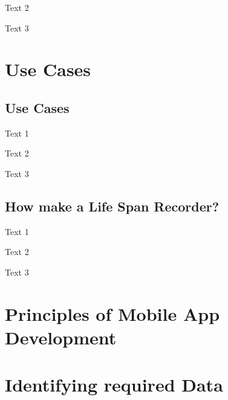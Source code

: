 Text 2

Text 3

\section{Use Cases} \label{sec:m3}

\subsection{Use Cases} \label{sec:m3.1}
Text 1

Text 2

Text 3

\subsection{How make a Life Span Recorder?} \label{sec:m3.2}
Text 1

Text 2

Text 3

\section{Principles of Mobile App Development} \label{sec:m4}


\section{Identifying required Data} \label{sec:m5}
